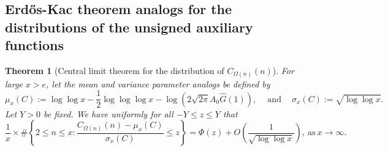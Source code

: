 \documentclass[11pt,reqno,a4letter]{article}
\numberwithin{figure}{section}
\numberwithin{table}{section}
\theoremstyle{plain}
\newtheorem{theorem}{Theorem}
\numberwithin{theorem}{section}
\theoremstyle{definition}
\begin{document}
\subsection{Erd\H{o}s-Kac theorem analogs for the distributions of the unsigned auxiliary functions} 
\label{subSection_ErdosKacTheorem_Analogs} 

\begin{theorem}[Central limit theorem for the distribution of $C_{\Omega(n)}(n)$] 
\label{theorem_CLT_VI} 
For large $x > e$, let the mean and variance parameter analogs be defined by 
\[
\mu_x(C) := \log\log x - \frac{1}{2}\log\log\log x - 
     \log\left(2\sqrt{2\pi}A_0 \widehat{G}(1)\right), 
     \quad \mathrm{\ and\ } \quad 
     \sigma_x(C) := \sqrt{\log\log x}. 
\]
Let $Y > 0$ be fixed. 
We have uniformly for all $-Y \leq z \leq Y$ that 
\[
\frac{1}{x} \times \#\left\{2 \leq n \leq x: 
     \frac{C_{\Omega(n)}(n) - \mu_x(C)}{\sigma_x(C)} \leq z\right\} = 
     \Phi\left(z\right) + O\left(\frac{1}{\sqrt{\log\log x}}\right), 
     \mathrm{\ as\ } x \rightarrow \infty. 
\] 
\end{theorem} 
\end{document}
